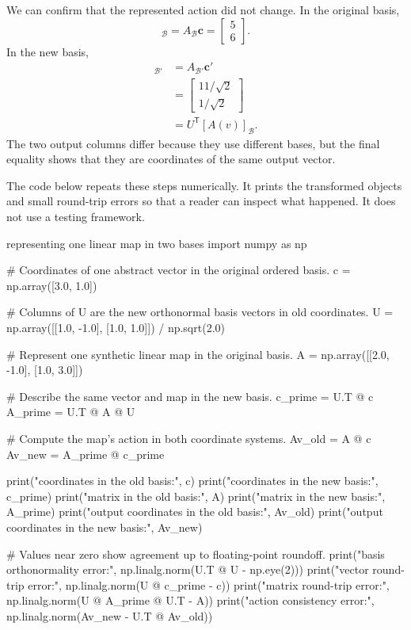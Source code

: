 We can confirm that the represented action did not change. In the original
basis,
\begin{equation}
  [A(v)]_{\mathcal B}
  =A_{\mathcal B}\mathbf c
  =\begin{bmatrix}5\\6\end{bmatrix}.
\end{equation}
In the new basis,
\begin{align}
  [A(v)]_{\mathcal B'}
  &=A_{\mathcal B'}\mathbf c'\\
  &=\begin{bmatrix}
      11/\sqrt2\\
      1/\sqrt2
    \end{bmatrix}\\
  &=U^{\mathsf T}[A(v)]_{\mathcal B}.
  \label{eq:training-two-basis-action-result}
\end{align}
The two output columns differ because they use different bases, but the final
equality shows that they are coordinates of the same output vector.

The code below repeats these steps numerically. It prints the transformed
objects and small round-trip errors so that a reader can inspect what happened.
It does not use a testing framework.

\begin{pythonexample}{representing one linear map in two bases}
import numpy as np

# Coordinates of one abstract vector in the original ordered basis.
c = np.array([3.0, 1.0])

# Columns of U are the new orthonormal basis vectors in old coordinates.
U = np.array([[1.0, -1.0], [1.0, 1.0]]) / np.sqrt(2.0)

# Represent one synthetic linear map in the original basis.
A = np.array([[2.0, -1.0], [1.0, 3.0]])

# Describe the same vector and map in the new basis.
c_prime = U.T @ c
A_prime = U.T @ A @ U

# Compute the map's action in both coordinate systems.
Av_old = A @ c
Av_new = A_prime @ c_prime

print("coordinates in the old basis:", c)
print("coordinates in the new basis:", c_prime)
print("matrix in the old basis:\n", A)
print("matrix in the new basis:\n", A_prime)
print("output coordinates in the old basis:", Av_old)
print("output coordinates in the new basis:", Av_new)

# Values near zero show agreement up to floating-point roundoff.
print("basis orthonormality error:", np.linalg.norm(U.T @ U - np.eye(2)))
print("vector round-trip error:", np.linalg.norm(U @ c_prime - c))
print("matrix round-trip error:", np.linalg.norm(U @ A_prime @ U.T - A))
print("action consistency error:", np.linalg.norm(Av_new - U.T @ Av_old))
\end{pythonexample}

